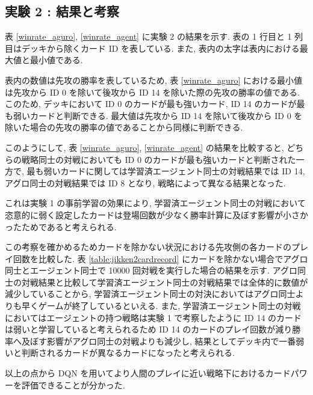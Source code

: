 \documentclass[12pt]{jarticle}
\begin{document}
\subsection{実験 2 : 結果と考察}
表 \ref{winrate_aguro}, \ref{winrate_agent} に実験 2 の結果を示す. 表の 1 行目と 1 列目はデッキから除くカード ID を表している. また, 表内の太字は表内における最大値と最小値である. 
\par
表内の数値は先攻の勝率を表しているため, 表 \ref{winrate_aguro} における最小値は先攻から ID 0 を除いて後攻から ID 14 を除いた際の先攻の勝率の値である. このため, デッキにおいて ID 0 のカードが最も強いカード, ID 14 のカードが最も弱いカードと判断できる. 最大値は先攻から ID 14 を除いて後攻から ID 0 を除いた場合の先攻の勝率の値であることから同様に判断できる.
\par
このようにして,  表 \ref{winrate_aguro}, \ref{winrate_agent} の結果を比較すると, どちらの戦略同士の対戦においても ID 0 のカードが最も強いカードと判断された一方で, 最も弱いカードに関しては学習済エージェント同士の対戦結果では ID 14, アグロ同士の対戦結果では ID 8 となり, 戦略によって異なる結果となった.\par
これは実験 1 の事前学習の効果により, 学習済エージェント同士の対戦において恣意的に弱く設定したカードは登場回数が少なく勝率計算に及ぼす影響が小さかったためであると考えられる. \par
この考察を確かめるためカードを除かない状況における先攻側の各カードのプレイ回数を比較した.
表 \ref{table:jikken2cardrecord} にカードを除かない場合でアグロ同士とエージェント同士で 10000 回対戦を実行した場合の結果を示す. アグロ同士の対戦結果と比較して学習済エージェント同士の対戦結果では全体的に数値が減少していることから, 学習済エージェント同士の対決においてはアグロ同士よりも早くゲームが終了しているといえる.
また, 学習済エージェント同士の対戦においてはエージェントの持つ戦略は実験 1 で考察したように ID 14 のカードは弱いと学習していると考えられるため ID 14 のカードのプレイ回数が減り勝率へ及ぼす影響がアグロ同士の対戦よりも減少し, 結果としてデッキ内で一番弱いと判断されるカードが異なるカードになったと考えられる.\par
以上の点から DQN を用いてより人間のプレイに近い戦略下におけるカードパワーを評価できることが分かった. 
\end{document}
